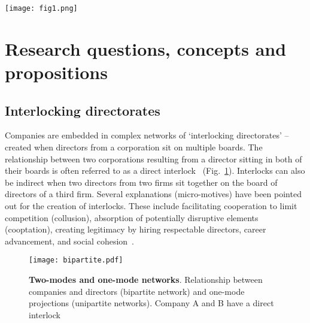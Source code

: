 \begin{figure*}
\begin{center}
\texttt{[image: fig1.png]}
\end{center}
\caption{Global network of interlocking directorates. Color indicates communities -- i.e. cities that do business together within each other more often than with others.}
\label{fig:fig1}
\end{figure*}

\section{Research questions, concepts and propositions}
\label{sec:question}
\subsection{Interlocking directorates}
Companies are embedded in complex networks of `interlocking directorates' -- 
created when directors from a corporation sit on multiple boards.
The relationship between two corporations resulting from a director sitting in both of their boards is often referred to as a direct interlock~\citep{Mizruchi1996} (Fig.~\ref{fig:bipartite}).
Interlocks can also be indirect when two directors from two firms sit together on the board of directors of a third firm. 
Several explanations (micro-motives) have been pointed out for the creation of interlocks. 
These include facilitating cooperation to limit competition (collusion),  
absorption of potentially disruptive elements (cooptation), 
creating legitimacy by hiring respectable directors, 
career advancement, and social cohesion~\citep{Mizruchi1996}.

\begin{figure}
\begin{center}
\texttt{[image: bipartite.pdf]}
\caption{\textbf{Two-modes and one-mode networks}. Relationship between companies and directors (bipartite network) and one-mode projections (unipartite networks). Company A and B have a direct interlock}
\label{fig:bipartite}
\end{center}
\end{figure}

